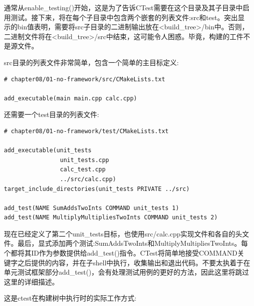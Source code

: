 通常从enable\_testing()开始，这是为了告诉CTest需要在这个目录及其子目录中启用测试。接下来，将在每个子目录中包含两个嵌套的列表文件:src和test。突出显示的bin值表明，需要将src子目录的二进制输出放在<build\_tree>/bin中。否则，二进制文件将在<build\_tree>/src中结束，这可能令人困惑。毕竟，构建的工件不是源文件。

src目录的列表文件非常简单，包含一个简单的主目标定义:

\begin{lstlisting}[style=styleCMake]
# chapter08/01-no-framework/src/CMakeLists.txt

add_executable(main main.cpp calc.cpp)
\end{lstlisting} 

还需要一个test目录的列表文件:

\begin{lstlisting}[style=styleCMake]
# chapter08/01-no-framework/test/CMakeLists.txt

add_executable(unit_tests
				unit_tests.cpp
				calc_test.cpp
				../src/calc.cpp)
target_include_directories(unit_tests PRIVATE ../src)

add_test(NAME SumAddsTwoInts COMMAND unit_tests 1)
add_test(NAME MultiplyMultipliesTwoInts COMMAND unit_tests 2)
\end{lstlisting} 

现在已经定义了第二个unit\_tests目标，也使用src/calc.cpp实现文件和各自的头文件。最后，显式添加两个测试:SumAddsTwoInts和MultiplyMultipliesTwoInts。每个都将其ID作为参数提供给add\_test()指令。CTest将简单地接受COMMAND关键字之后提供的内容，并在子shell中执行，收集输出和退出代码。不要太执着于在单元测试框架部分add\_test()，会有处理测试用例的更好的方法，因此这里将跳过这里的详细描述。

这是ctest在构建树中执行时的实际工作方式:


